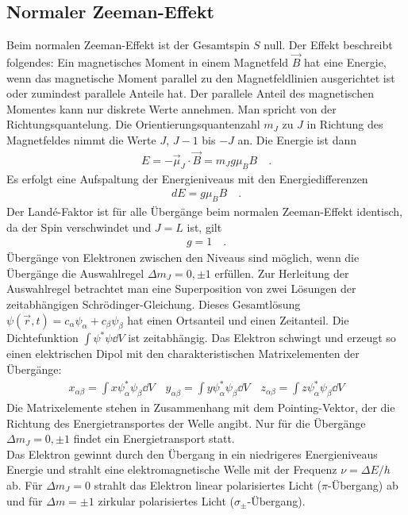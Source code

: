 \subsection{Normaler Zeeman-Effekt}\label{sec:normaler}
Beim normalen Zeeman-Effekt ist der Gesamtspin $S$ null. Der Effekt beschreibt folgendes: Ein magnetisches Moment in einem Magnetfeld $\vec{B}$ hat eine Energie, wenn das magnetische Moment parallel zu den Magnetfeldlinien ausgerichtet ist oder zumindest parallele Anteile hat. Der parallele Anteil des magnetischen Momentes kann nur diskrete Werte annehmen. Man spricht von der Richtungsquantelung. Die Orientierungsquantenzahl $m_J$ zu $J$ in Richtung des Magnetfeldes nimmt die Werte $J$, $J-1$ bis $-J$ an. Die Energie ist dann
\begin{align}
	E = - \vec{\mu}_J \cdot \vec{B} = m_J g \mu_B B \quad .
\end{align}
 Es erfolgt eine Aufspaltung der Energieniveaus mit den Energiedifferenzen
\begin{align}\label{eq:Energieverschiebung}
	dE = g\mu_B B \quad .
\end{align}
Der Landé-Faktor ist für alle Übergänge beim normalen Zeeman-Effekt identisch, da der Spin verschwindet und $J = L$ ist,  gilt 
\begin{align}
	g = 1 \quad .
\end{align}
Übergänge von Elektronen zwischen den Niveaus sind möglich, wenn die Übergänge die Auswahlregel $\Delta m_J = 0, \pm 1$ erfüllen. Zur Herleitung der Auswahlregel betrachtet man eine Superposition von zwei Lösungen der zeitabhängigen Schrödinger-Gleichung. Dieses Gesamtlösung $\psi(\vec{r}, t) = c_\alpha \psi_\alpha + c_\beta \psi_\beta$ hat einen Ortsanteil und einen Zeitanteil. Die Dichtefunktion $\int \psi^{*}\psi \dd V$ ist zeitabhängig. Das Elektron schwingt und erzeugt so einen elektrischen Dipol mit den charakteristischen Matrixelementen der Übergänge:
\begin{align}
	x_{\alpha \beta} = \int x \psi_\alpha^{*}\psi_\beta \dd V \quad
	y_{\alpha \beta} = \int y \psi_\alpha^{*}\psi_\beta \dd V \quad
	z_{\alpha \beta} = \int z \psi_\alpha^{*}\psi_\beta \dd V
\end{align}
Die Matrixelemente stehen in Zusammenhang mit dem Pointing-Vektor, der die Richtung des Energietransportes der Welle angibt. Nur für die Übergänge  $\Delta m_J = 0, \pm 1$ findet ein Energietransport statt.
\\Das Elektron gewinnt durch den Übergang in ein niedrigeres Energieniveaus Energie und strahlt  eine elektromagnetische Welle mit der Frequenz $\nu= \Delta E / h $ ab. Für $\Delta m_J = 0$ strahlt das Elektron linear polarisiertes Licht ($\pi$-Übergang) ab und für $\Delta m = \pm 1$ zirkular polarisiertes Licht ($\sigma_{\pm}$-Übergang). 
